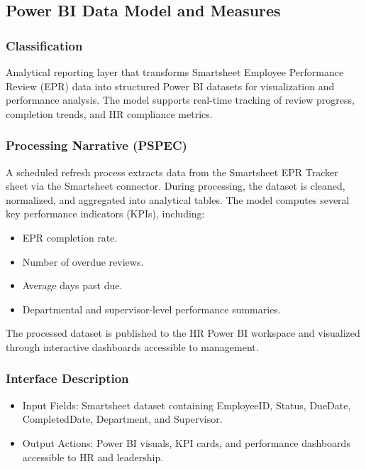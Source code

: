 \documentclass[12pt]{article}
\def\textbf#1{#1}%
\begin{document}
\subsection{Power BI Data Model and Measures}

\subsubsection{Classification}
Analytical reporting layer that transforms Smartsheet Employee Performance Review (EPR) data into structured Power BI datasets for visualization and performance analysis.  
The model supports real-time tracking of review progress, completion trends, and HR compliance metrics.

\subsubsection{Processing Narrative (PSPEC)}
A scheduled refresh process extracts data from the Smartsheet EPR Tracker sheet via the Smartsheet connector.  
During processing, the dataset is cleaned, normalized, and aggregated into analytical tables.  
The model computes several key performance indicators (KPIs), including:
\begin{itemize}[nosep]
  \item EPR completion rate.
  \item Number of overdue reviews.
  \item Average days past due.
  \item Departmental and supervisor-level performance summaries.
\end{itemize}
The processed dataset is published to the HR Power BI workspace and visualized through interactive dashboards accessible to management.

\subsubsection{Interface Description}
\begin{itemize}[nosep]
  \item \textbf{Input Fields:} Smartsheet dataset containing EmployeeID, Status, DueDate, CompletedDate, Department, and Supervisor.
  \item \textbf{Output Actions:} Power BI visuals, KPI cards, and performance dashboards accessible to HR and leadership.
\end{itemize}
\end{document}

